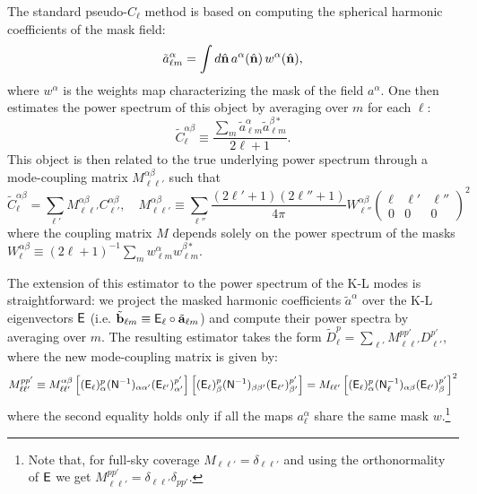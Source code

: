 \documentclass[twocolumn,amsfont,amssymb,amsmath, showpacs,balancelastpage, nofootinbib]{revtex4-1}
\newcommand{\nv}{\hat{\bf n}}
\begin{document}
  The standard pseudo-$C_\ell$ method is based on computing the spherical harmonic coefficients of the mask field:
  \begin{equation}
    \tilde{a}^\alpha_{\ell m}=\int d\nv\,a^\alpha(\nv)\,w^\alpha(\nv),
  \end{equation}
  where $w^\alpha$ is the weights map characterizing the mask of the field $a^\alpha$. One then estimates the power spectrum of this object by averaging over $m$ for each $\ell$:
  \begin{equation}
    \tilde{C}^{\alpha\beta}_\ell\equiv\frac{\sum_m\tilde{a}^\alpha_{\ell m}\tilde{a}^{\beta *}_{\ell m}}{2\ell+1}.
  \end{equation}
  This object is then related to the true underlying power spectrum through a mode-coupling matrix $M^{\alpha\beta}_{\ell\ell'}$ such that
  \begin{equation}
    \tilde{C}^{\alpha\beta}_\ell=\sum_{\ell'}M^{\alpha\beta}_{\ell\ell'}C^{\alpha\beta}_{\ell'},\hspace{12pt}
    M^{\alpha\beta}_{\ell \ell'}\equiv\sum_{\ell''}\frac{(2\ell'+1)(2\ell''+1)}{4\pi}W^{\alpha\beta}_{\ell''}
    \left(
    \begin{array}{ccc}
      \ell & \ell' & \ell''\\
      0 & 0 & 0
    \end{array}
    \right)^2
  \end{equation}
  where the coupling matrix $M$ depends solely on the power spectrum of the masks $W^{\alpha\beta}_\ell\equiv(2\ell+1)^{-1}\sum_mw^\alpha_{\ell m}w^{\beta *}_{\ell m}$.
  
  The extension of this estimator to the power spectrum of the K-L modes is straightforward: we project the masked harmonic coefficients $\tilde{a}^\alpha$ over the K-L eigenvectors ${\sf E}$ (i.e. $\tilde{\bf b}_{\ell m}\equiv {\sf E}_\ell\circ\tilde{\bf a}_{\ell m}$) and compute their power spectra by averaging over $m$. The resulting estimator takes the form $\tilde{D}^p_\ell=\sum_{\ell'}M_{\ell\ell'}^{pp'}D^{p'}_{\ell'}$, where the new mode-coupling matrix is given by:
  \begin{equation}
    M^{pp'}_{\ell\ell'}\equiv M^{\alpha\beta}_{\ell\ell'}\left[({\sf E}_\ell)^p_\alpha({\sf N}^{-1})_{\alpha\alpha'}({\sf E}_{\ell'})^{p'}_{\alpha'}\right]\left[({\sf E}_\ell)^p_\beta({\sf N}^{-1})_{\beta\beta'}({\sf E}_{\ell'})^{p'}_{\beta'}\right]
    =M_{\ell\ell'}\left[({\sf E}_\ell)^p_\alpha({\sf N}^{-1}_\ell)_{\alpha\beta}({\sf E}_{\ell'})^{p'}_\beta\right]^2
  \end{equation}
  where the second equality holds only if all the maps $a^\alpha_\ell$ share the same mask $w$.\footnote{Note that, for full-sky coverage $M_{\ell\ell'}=\delta_{\ell\ell'}$ and using the orthonormality of ${\sf E}$ we get $M^{pp'}_{\ell\ell'}=\delta_{\ell\ell'}\delta_{pp'}$.}
  
  \cite{2013arXiv1307.1307M,2015PhRvD..92l3010L}
\end{document}
